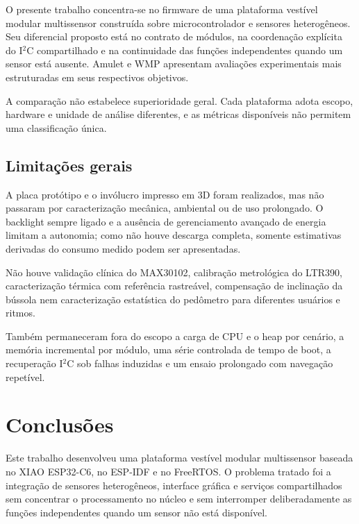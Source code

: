 \documentclass[a4paper,12pt]{article}
\begin{document}
O presente trabalho concentra-se no firmware de uma plataforma vest\'ivel modular multissensor constru\'ida sobre microcontrolador e sensores heterog\^eneos. Seu diferencial proposto est\'a no contrato de m\'odulos, na coordena\c{c}\~ao expl\'icita do I$^2$C compartilhado e na continuidade das fun\c{c}\~oes independentes quando um sensor est\'a ausente. Amulet e WMP apresentam avalia\c{c}\~oes experimentais mais estruturadas em seus respectivos objetivos.


A compara\c{c}\~ao n\~ao estabelece superioridade geral. Cada plataforma adota escopo, hardware e unidade de an\'alise diferentes, e as m\'etricas dispon\'iveis n\~ao permitem uma classifica\c{c}\~ao \'unica.


\subsection{Limita\c{c}\~oes gerais}


A placa prot\'otipo e o inv\'olucro impresso em 3D foram realizados, mas n\~ao passaram por caracteriza\c{c}\~ao mec\^anica, ambiental ou de uso prolongado. O backlight sempre ligado e a aus\^encia de gerenciamento avan\c{c}ado de energia limitam a autonomia; como n\~ao houve descarga completa, somente estimativas derivadas do consumo medido podem ser apresentadas.


N\~ao houve valida\c{c}\~ao cl\'inica do MAX30102, calibra\c{c}\~ao metrol\'ogica do LTR390, caracteriza\c{c}\~ao t\'ermica com refer\^encia rastre\'avel, compensa\c{c}\~ao de inclina\c{c}\~ao da b\'ussola nem caracteriza\c{c}\~ao estat\'istica do ped\^ometro para diferentes usu\'arios e ritmos.


Tamb\'em permaneceram fora do escopo a carga de CPU e o heap por cen\'ario, a mem\'oria incremental por m\'odulo, uma s\'erie controlada de tempo de boot, a recupera\c{c}\~ao I$^2$C sob falhas induzidas e um ensaio prolongado com navega\c{c}\~ao repet\'ivel.

\clearpage
\section{Conclus\~oes}


Este trabalho desenvolveu uma plataforma vest\'ivel modular multissensor baseada no XIAO ESP32-C6, no ESP-IDF e no FreeRTOS. O problema tratado foi a integra\c{c}\~ao de sensores heterog\^eneos, interface gr\'afica e servi\c{c}os compartilhados sem concentrar o processamento no n\'ucleo e sem interromper deliberadamente as fun\c{c}\~oes independentes quando um sensor n\~ao est\'a dispon\'ivel.
\end{document}
